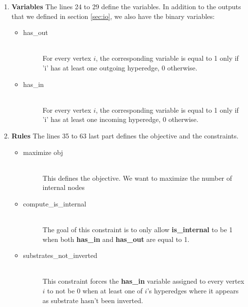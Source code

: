 \begin{enumerate}
    \item \textbf{Variables} The lines 24 to 29 define the variables. In addition to the outputs that we defined in section \ref{sec:io}, we also have the binary variables:
    \begin{itemize}
        \item 
        \begin{description}
            \item[has\_out] ~\\ For every vertex $i$, the corresponding variable is equal to 1 only if 'i' has at least one outgoing hyperedge, 0 otherwise.
        \end{description}
        \item 
        \begin{description}
            \item[has\_in] ~\\ For every vertex $i$, the corresponding variable is equal to 1 only if 'i' has at least one incoming hyperedge, 0 otherwise.
        \end{description}
    \end{itemize}
    \item \textbf{Rules} The lines 35 to 63 last part defines the objective and the constraints.
    \begin{itemize}
        \item 
        \begin{description}
            \item[maximize obj] ~\\
            This defines the objective. We want to maximize the number of internal nodes
        \end{description}
        \item 
        \begin{description}
            \item[compute\_is\_internal] ~\\
            The goal of this constraint is to only allow \textbf{is\_internal} to be 1 when both \textbf{has\_in} and \textbf{has\_out} are equal to 1.
        \end{description}
        \item 
        \begin{description}
            \item[substrates\_not\_inverted] ~\\
            This constraint forces the \textbf{has\_in} variable assigned to every vertex $i$ to not be 0 when at least one of $i$'s hyperedges where it appears as substrate hasn't been inverted.

\end{description}
\end{itemize}
\end{enumerate}
